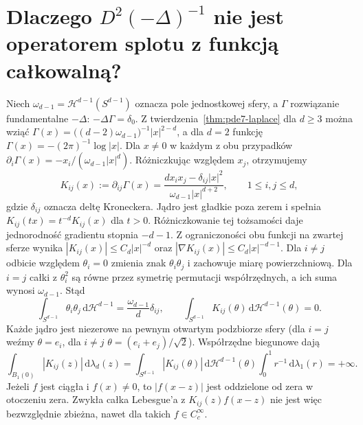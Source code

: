 \section[Dlaczego pojawiają się całki osobliwe?]{Dlaczego $D^2(-\Delta)^{-1}$ nie jest operatorem splotu z funkcją całkowalną?}
Niech $\omega_{d-1}=\mathcal H^{d-1}(S^{d-1})$ oznacza pole
jednostkowej sfery, a $\Gamma$ rozwiązanie fundamentalne $-\Delta$:
$-\Delta\Gamma=\delta_0$. Z twierdzenia~\ref{thm:pde7-laplace} dla $d\ge3$ można wziąć
$\Gamma(x)=\bigl((d-2)\omega_{d-1}\bigr)^{-1}|x|^{2-d}$,
a dla $d=2$ funkcję $\Gamma(x)=-(2\pi)^{-1}\log|x|$.
Dla $x\ne0$ w każdym z obu przypadków
$\partial_i\Gamma(x)=-x_i/(\omega_{d-1}|x|^d)$.
Różniczkując względem $x_j$, otrzymujemy
\begin{equation}\label{eq:pde16-kernel}
 K_{ij}(x):=\partial_{ij}\Gamma(x)
 =\frac{d x_ix_j-\delta_{ij}|x|^2}
 {\omega_{d-1}|x|^{d+2}},\qquad 1\le i,j\le d,
\end{equation}
gdzie $\delta_{ij}$ oznacza deltę Kroneckera.
Jądro jest gładkie poza zerem i spełnia
$K_{ij}(tx)=t^{-d}K_{ij}(x)$ dla $t>0$.
Różniczkowanie tej tożsamości daje jednorodność gradientu
stopnia $-d-1$. Z ograniczoności obu funkcji na zwartej
sferze wynika $|K_{ij}(x)|\le C_d|x|^{-d}$ oraz
$|\nabla K_{ij}(x)|\le C_d|x|^{-d-1}$.
Dla $i\ne j$ odbicie względem $\theta_i=0$ zmienia znak
$\theta_i\theta_j$ i zachowuje miarę powierzchniową.
Dla $i=j$ całki z $\theta_i^2$ są równe przez symetrię
permutacji współrzędnych, a ich suma wynosi $\omega_{d-1}$.
Stąd
\[
 \int_{S^{d-1}}\theta_i\theta_j\,\mathrm d\mathcal H^{d-1}
 =\frac{\omega_{d-1}}d\delta_{ij},\qquad
 \int_{S^{d-1}}K_{ij}(\theta)\,\mathrm d\mathcal H^{d-1}(\theta)=0.
\]
Każde jądro jest niezerowe na pewnym otwartym podzbiorze
sfery (dla $i=j$ weźmy $\theta=e_i$, dla $i\ne j$
$\theta=(e_i+e_j)/\sqrt2$). Współrzędne biegunowe dają
\[
 \int_{B_1(0)}|K_{ij}(z)|\,\mathrm d\lambda_d(z)
 =\int_{S^{d-1}}|K_{ij}(\theta)|\,\mathrm d\mathcal H^{d-1}(\theta)
 \int_0^1 r^{-1}\,\mathrm d\lambda_1(r)=+\infty .
\]
Jeżeli $f$ jest ciągła i $f(x)\ne0$, to $|f(x-z)|$
jest oddzielone od zera w otoczeniu zera. Zwykła całka
Lebesgue'a z $K_{ij}(z)f(x-z)$ nie jest więc bezwzględnie
zbieżna, nawet dla takich $f\in C_c^\infty$.

